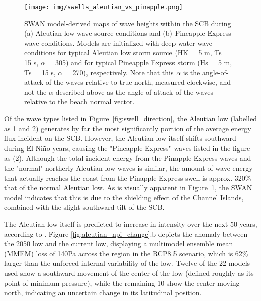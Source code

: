 \documentclass[12pt, letterpaper]{article}
\begin{document}
	\begin{figure}[h]
		\centering
		\texttt{[image: img/swells\_aleutian\_vs\_pinapple.png]}
		\caption{SWAN model-derived maps of wave heights within the SCB during (a) Aleutian low wave-source conditions and (b) Pineapple Express wave conditions. Models are initialized with deep-water wave conditions for typical Aleutian low storm source (HK = 5 m, Ts = 15 s, $\alpha$ = 305\degree) and for typical Pineapple Express storm (Hs = 5 m, Ts = 15 s, $\alpha$ = 270\degree), respectively. Note that this $\alpha$ is the angle-of-attack of the waves relative to true-north, measured clockwise, and not the $\alpha$ described above as the angle-of-attack of the waves relative to the beach normal vector.\citep{swells-deep-water-waves}}
		\label{fig:aleutian_vs_pineapple}
	\end{figure}

	Of the wave types listed in Figure~\ref{fig:swell_direction}, the Aleutian low (labelled as 1 and 2) generates by far the most significantly portion of the average energy flux incident on the SCB. However, the Aleutian low itself shifts southward during El Ni\~no years, causing the "Pineapple Express" waves listed in the figure as (2). Although the total incident energy from the Pinapple Express waves and the "normal" northerly Aleutian low waves is similar, the amount of wave energy that actually reaches the coast from the Pinapple Express swell is approx. 320\% that of the normal Aleutian low. \citep{swells-deep-water-waves} As is visually apparent in Figure~\ref{fig:aleutian_vs_pineapple}, the SWAN model indicates that this is due to the shielding effect of the Channel Islands, combined with the slight southward tilt of the SCB.

	The Aleutian low itself is predicted to increase in intensity over the next 50 years, according to \citeauthor{swells-aleutian-low}. Figure \ref{fig:aleutian_npi_change}.b depicts the anomaly between the 2050 low and the current low, displaying a multimodel ensemble mean (MMEM) loss of 140Pa across the region in the RCP8.5 scenario, which is 62\% larger than the unforced internal variability of the low. Twelve of the 22 models used show a southward movement of the center of the low (defined roughly as its point of minimum pressure), while the remaining 10 show the center moving north, indicating an uncertain change in its latitudinal position. \citep{swells-aleutian-low}
\end{document}
